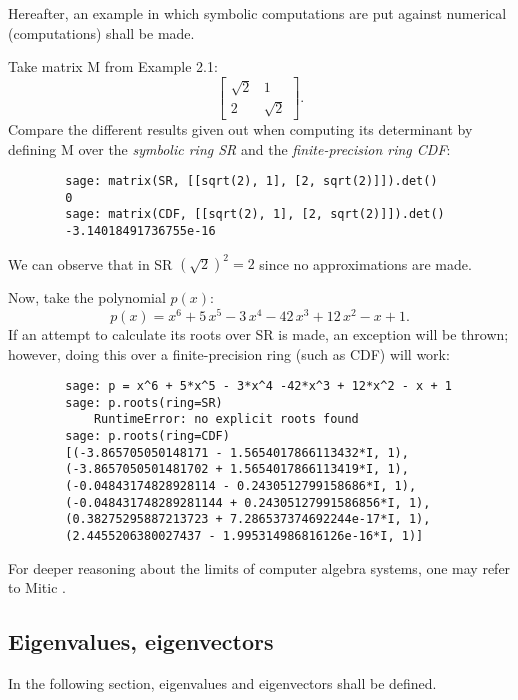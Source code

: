 Hereafter, an example in which symbolic computations are put against numerical (computations) shall be made.
\begin{example}
    Take matrix M from Example 2.1:
    \[
        \begin{bmatrix}
            \sqrt{2}  &   1    \\
                2     & \sqrt{2}
        \end{bmatrix}.
    \]
    Compare the different results given out when computing its determinant by defining M over the \textit{symbolic ring SR} and
    the \textit{finite-precision ring CDF}:
    \begin{verbatim}
        sage: matrix(SR, [[sqrt(2), 1], [2, sqrt(2)]]).det()
        0
        sage: matrix(CDF, [[sqrt(2), 1], [2, sqrt(2)]]).det()
        -3.14018491736755e-16
    \end{verbatim}
    We can observe that in SR \((\sqrt{2})^2 = 2\) since no approximations are made.

    Now, take the polynomial \(p(x)\):
    \[
        p(x) = x^{6} + 5 \, x^{5} - 3 \, x^{4} - 42 \, x^{3} + 12 \, x^{2} - x + 1.
    \]
    If an attempt to calculate its roots over SR is made, an exception will be thrown; however, doing this over a
    finite-precision ring (such as CDF) will work:
    \begin{verbatim}
        sage: p = x^6 + 5*x^5 - 3*x^4 -42*x^3 + 12*x^2 - x + 1
        sage: p.roots(ring=SR)
            RuntimeError: no explicit roots found
        sage: p.roots(ring=CDF)
        [(-3.865705050148171 - 1.5654017866113432*I, 1),
        (-3.8657050501481702 + 1.5654017866113419*I, 1),
        (-0.04843174828928114 - 0.2430512799158686*I, 1),
        (-0.048431748289281144 + 0.24305127991586856*I, 1),
        (0.38275295887213723 + 7.286537374692244e-17*I, 1),
        (2.4455206380027437 - 1.995314986816126e-16*I, 1)]
    \end{verbatim}
\end{example}

For deeper reasoning about the limits of computer algebra systems, one may refer to Mitic \cite{mitic}.

\subsection*{Eigenvalues, eigenvectors}
In the following section, eigenvalues and eigenvectors shall be defined.

